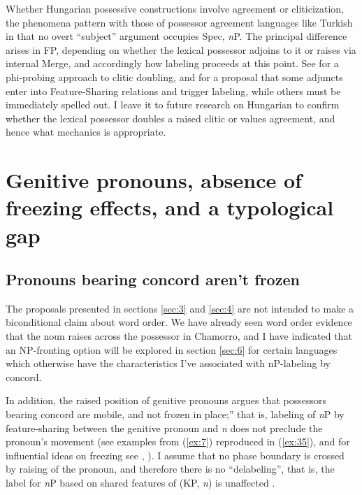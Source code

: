 \documentclass[output=paper
,modfonts
,nonflat]{langsci/langscibook}
\begin{document}
Whether Hungarian possessive constructions involve agreement or cliticization, the phenomena pattern with those of possessor agreement languages like Turkish in that no overt “subject” argument occupies Spec, \textit{n}P. The principal difference arises in FP, depending on whether the lexical possessor adjoins to it or raises via internal Merge, and accordingly how labeling proceeds at this point. See \citet{Preminger2015} for a phi-probing approach to clitic doubling, and \citet{Oseki2014} for a proposal that some adjuncts enter into Feature-Sharing relations and trigger labeling, while others must be immediately spelled out. I leave it to future research on Hungarian to confirm whether the lexical possessor doubles a raised clitic or values agreement, and hence what mechanics is appropriate.

\section{Genitive pronouns, absence of freezing effects, and a typological gap} \label{sec:5}

\subsection{Pronouns bearing concord aren't frozen}\label{sec:5.1}
The proposals presented in sections \ref{sec:3} and \ref{sec:4} are not intended to make a biconditional claim about word order. We have already seen word order evidence that the noun raises across the possessor in Chamorro, and I have indicated that an NP-fronting option will be explored in section \ref{sec:6} for certain languages which otherwise have the characteristics I’ve associated with nP-labeling by concord. 

In addition, the raised position of genitive pronouns argues that possessors bearing concord are mobile, and not {\textquotedbl}frozen in place;” that is, labeling of \textit{n}P by feature-sharing between the genitive pronoun and \textit{n} does not preclude the pronoun’s movement (see examples from (\ref{ex:7}) reproduced in (\ref{ex:35}), and for influential ideas on freezing see \citealt{Rizzi2006}, \citealt{Rizzi_Shlonsky2007}). I assume that no phase boundary is crossed by raising of the pronoun, and therefore there is no “delabeling”, that is, the label for \textit{n}P based on shared features of (KP, \textit{n}) is unaffected \citep[11]{Chomsky2015}.
\end{document}
